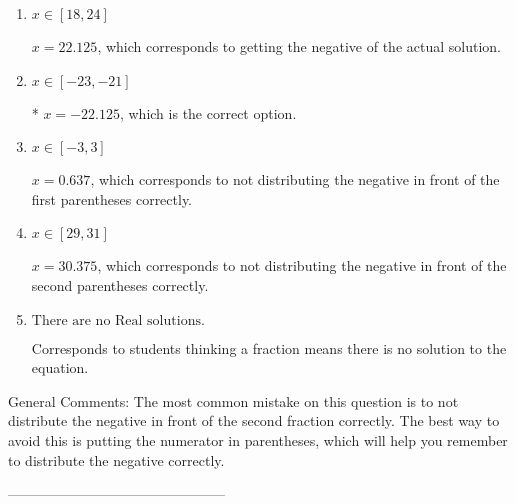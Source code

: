 \documentclass{extbook}[14pt]
\begin{document}
\begin{enumerate}[label=\Alph*.] 
\item $ x \in [18, 24] $ 

  $x = 22.125$, which corresponds to getting the negative of the actual solution. 
\item $ x \in [-23, -21] $ 

 * $x = -22.125$, which is the correct option. 
\item $ x \in [-3, 3] $ 

  $x = 0.637$, which corresponds to not distributing the negative in front of the first parentheses correctly. 
\item $ x \in [29, 31] $ 

  $x = 30.375$, which corresponds to not distributing the negative in front of the second parentheses correctly. 
\item $ \text{There are no Real solutions. } $ 

 Corresponds to students thinking a fraction means there is no solution to the equation. 
\end{enumerate} 
 
General Comments: The most common mistake on this question is to not distribute the negative in front of the second fraction correctly. The best way to avoid this is putting the numerator in parentheses, which will help you remember to distribute the negative correctly.

-----------------------------------------------
\end{document}
